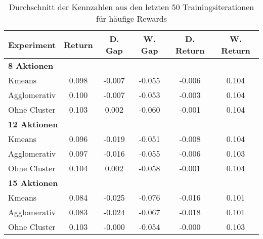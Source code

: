 \begin{table}[ht]
\centering
\caption{Durchschnitt der Kennzahlen aus den letzten 50 Trainingsiterationen für häufige Rewards}
\begin{tabular}{lccccc}
\hline
\textbf{Experiment} & \textbf{Return} & \textbf{D. Gap} & \textbf{W. Gap} & \textbf{D. Return} & \textbf{W. Return} \\
\hline
\multicolumn{6}{l}{\textbf{8 Aktionen}} \\
\hspace{1em}Kmeans & 0.098 & -0.007 & -0.055& -0.006 & 0.104 \\
\hspace{1em}Agglomerativ & 0.100 & -0.007 & -0.053& -0.003 & 0.104 \\
\hspace{1em}Ohne Cluster & 0.103 & 0.002 & -0.060& -0.001 & 0.104 \\
\hline
\multicolumn{6}{l}{\textbf{12 Aktionen}} \\
\hspace{1em}Kmeans & 0.096 & -0.019 & -0.051& -0.008 & 0.104 \\
\hspace{1em}Agglomerativ & 0.097 & -0.016 & -0.055& -0.006 & 0.103 \\
\hspace{1em}Ohne Cluster & 0.104 & 0.002 & -0.058& -0.001 & 0.104 \\
\hline
\multicolumn{6}{l}{\textbf{15 Aktionen}} \\
\hspace{1em}Kmeans & 0.084 & -0.025 & -0.076& -0.016 & 0.101 \\
\hspace{1em}Agglomerativ & 0.083 & -0.024 & -0.067& -0.018 & 0.101 \\
\hspace{1em}Ohne Cluster & 0.103 & -0.000 & -0.054& -0.000 & 0.103 \\
\hline
\end{tabular}
\end{table}



